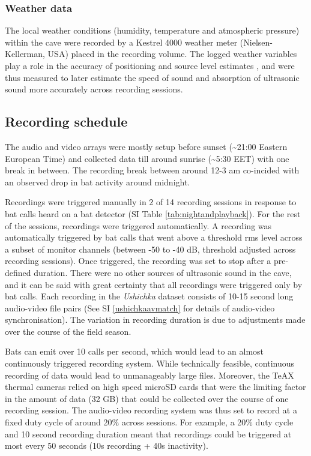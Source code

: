 \documentclass[
]{book}
\begin{document}
\hypertarget{weather-data}{%
\subsubsection{Weather data}\label{weather-data}}

The local weather conditions (humidity, temperature and atmospheric pressure) within the cave were recorded by a Kestrel 4000 weather meter (Nielsen-Kellerman, USA) placed in the recording volume. The logged weather variables play a role in the accuracy of positioning and source level estimates \citep{goerlitz2018weather, lawrence1982measurements}, and were thus measured to later estimate the speed of sound and absorption of ultrasonic sound more accurately across recording sessions.

\hypertarget{recschedule}{%
\subsection{Recording schedule}\label{recschedule}}

The audio and video arrays were mostly setup before sunset (\textasciitilde21:00 Eastern European Time) and collected data till around sunrise (\textasciitilde5:30 EET) with one break in between. The recording break between around 12-3 am co-incided with an observed drop in bat activity around midnight.

Recordings were triggered manually in 2 of 14 recording sessions in response to bat calls heard on a bat detector (SI Table \ref{tab:nightandplayback}). For the rest of the sessions, recordings were triggered automatically. A recording was automatically triggered by bat calls that went above a threshold rms level across a subset of monitor channels (between -50 to -40 dB, threshold adjusted across recording sessions). Once triggered, the recording was set to stop after a pre-defined duration. There were no other sources of ultrasonic sound in the cave, and it can be said with great certainty that all recordings were triggered only by bat calls. Each recording in the \emph{Ushichka} dataset consists of 10-15 second long audio-video file pairs (See SI \ref{ushichkaavmatch} for details of audio-video synchronisation). The variation in recording duration is due to adjustments made over the course of the field season.

Bats can emit over 10 calls per second, which would lead to an almost continuously triggered recording system. While technically feasible, continuous recording of data would lead to unmanageably large files. Moreover, the TeAX thermal cameras relied on high speed microSD cards that were the limiting factor in the amount of data (32 GB) that could be collected over the course of one recording session. The audio-video recording system was thus set to record at a fixed duty cycle of around 20\% across sessions. For example, a 20\% duty cycle and 10 second recording duration meant that recordings could be triggered at most every 50 seconds (10s recording + 40s inactivity).
\end{document}
